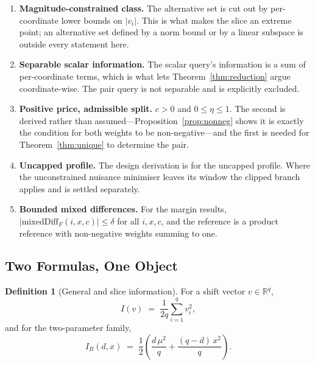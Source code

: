 \documentclass[conference]{IEEEtran}
\theoremstyle{definition}
\newtheorem{definition}[theorem]{Definition}
\begin{document}
\begin{enumerate}
\item[1)] \textbf{Magnitude-constrained class.} The alternative set is cut out by
per-coordinate lower bounds on $|v_{i}|$. This is what makes the slice an extreme point; an
alternative set defined by a norm bound or by a linear subspace is outside every statement
here.

\item[2)] \textbf{Separable scalar information.} The scalar query's information is a sum of
per-coordinate terms, which is what lets Theorem~\ref{thm:reduction} argue coordinate-wise.
The pair query is not separable and is explicitly excluded.

\item[3)] \textbf{Positive price, admissible split.} $c>0$ and $0\le\eta\le1$. The second is
derived rather than assumed---Proposition~\ref{prop:nonneg} shows it is exactly the condition
for both weights to be non-negative---and the first is needed for
Theorem~\ref{thm:unique} to determine the pair.

\item[4)] \textbf{Uncapped profile.} The design derivation is for the uncapped profile. Where
the unconstrained nuisance minimiser leaves its window the clipped branch applies and is
settled separately.

\item[5)] \textbf{Bounded mixed differences.} For the margin results,
$|\mathrm{mixedDiff}_{F}(i,x,c)|\le\delta$ for all $i,x,c$, and the reference is a product
reference with non-negative weights summing to one.
\end{enumerate}

\subsection{Two Formulas, One Object}
\label{sec:reduction}

\begin{definition}[General and slice information]
For a shift vector $v\in\mathbb{R}^{q}$,
\begin{equation}
I(v)\;=\;\frac{1}{2q}\sum_{i=1}^{q} v_{i}^{2},
\label{eq:igen}
\end{equation}
and for the two-parameter family,
\begin{equation}
I_{B}(d,x)\;=\;\frac{1}{2}\left(\frac{d\,\mu^{2}}{q}+\frac{(q-d)\,x^{2}}{q}\right).
\label{eq:ib}
\end{equation}
\end{definition}
\end{document}
